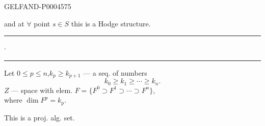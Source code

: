\begin{GelfandAdjacentEvidence}{GELFAND-P000457}{5}

and at $\forall$ point $s\in S$ this is a Hodge structure.

\begin{center}
\rule[.5ex]{15mm}{.35pt}\enspace$\cdot$\enspace\rule[.5ex]{22mm}{.35pt}
\end{center}

Let $0\le p\le n$,\quad $k_p\ge k_{p+1}$ — a seq. of numbers
\[
k_0\ge k_1\ge\cdots\ge k_n.
\]
$Z$ — space with elem. $F=\{F^0\supset F^1\supset\cdots\supset F^n\}$,\\
where $\dim F^p=k_p$.
\end{GelfandAdjacentEvidence}


This is a proj. alg. set.


